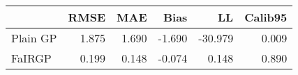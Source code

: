 \begin{tabular}{lrrrrr}
\toprule
{} &   RMSE &    MAE &   Bias &      LL &  Calib95 \\
\midrule
Plain GP &  1.875 &  1.690 & -1.690 & -30.979 &    0.009 \\
FaIRGP   &  0.199 &  0.148 & -0.074 &   0.148 &    0.890 \\
\bottomrule
\end{tabular}
